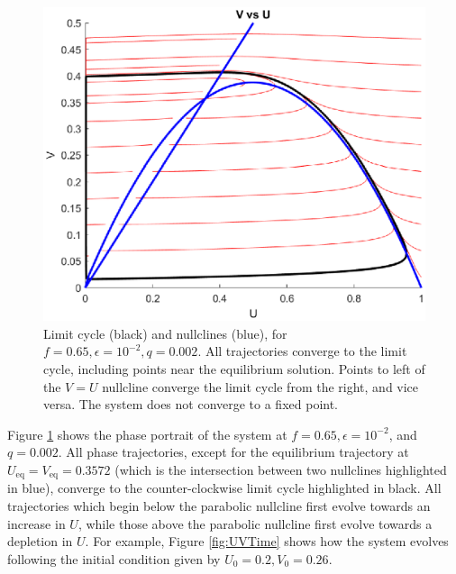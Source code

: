 \documentclass[twocolumn,amsmath,amssymb,aps]{revtex4}
\begin{document}
\begin{figure}[!htb]
	\includegraphics[scale=0.5]{limit_cycle_f_065_e_1e-2.eps}
	\caption{Limit cycle (black) and nullclines (blue), for $f = 0.65, \epsilon = 10^{-2}, q = 0.002$. All trajectories converge to the limit cycle, including points near the equilibrium solution. Points to left of the $V=U$ nullcline converge the limit cycle from the right, and vice versa. The system does not converge to  a fixed point.}
	\label{fig:LC}
\end{figure}

Figure \ref{fig:LC} shows the phase portrait of the system at $f = 0.65, \epsilon = 10^{-2}$, and $q = 0.002$. All phase trajectories, except for the equilibrium trajectory at $U_{\text{eq}} = V_{\text{eq}} = 0.3572$ (which is the intersection between two nullclines highlighted in blue), converge to the counter-clockwise limit cycle highlighted in black. All trajectories which begin below the parabolic nullcline first evolve towards an increase in $U$, while those above the parabolic nullcline first evolve towards a depletion in $U$. For example, Figure \ref{fig:UVTime} shows how the system evolves following the initial condition given by $U_0 = 0.2, V_0 = 0.26$. 
\end{document}
